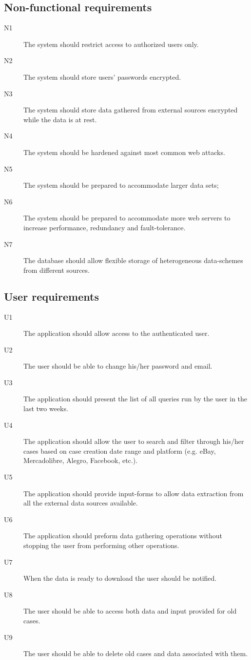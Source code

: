 \subsection{Non-functional requirements}

\begin{description}
  \item[N1] The system should restrict access to authorized users only.
  \item[N2] The system should store users' passwords encrypted.
  \item[N3] The system should store data gathered from external sources
  encrypted while the data is at rest.
  \item[N4] The system should be hardened against most common web attacks.
  \item[N5] The system should be prepared to accommodate larger data
  sets;
  \item[N6] The system should be prepared to accommodate more web servers to
  increase performance, redundancy and fault-tolerance.
  \item[N7] The database should allow flexible storage of heterogeneous
  data-schemes from different sources.
\end{description}

\subsection{User requirements}
\begin{description}
\item[U1] The application should allow access to the authenticated user.
\item[U2] The user should be able to change his/her password and email.
\item[U3] The application should present the list of all queries run by the user
in the last two weeks.
\item[U4] The application should allow the user to search and filter through
his/her cases based on case creation date range and platform (e.g. eBay,
Mercadolibre, Alegro, Facebook, etc.).
\item[U5] The application should provide input-forms to allow data extraction
from all the external data sources available.
\item[U6] The application should preform data gathering operations without
stopping the user from performing other operations.
\item[U7] When the data is ready to download the user should be notified.
\item[U8] The user should be able to access both data and input provided for old
cases.
\item[U9] The user should be able to delete old cases and data associated with
them.
\end{description}


